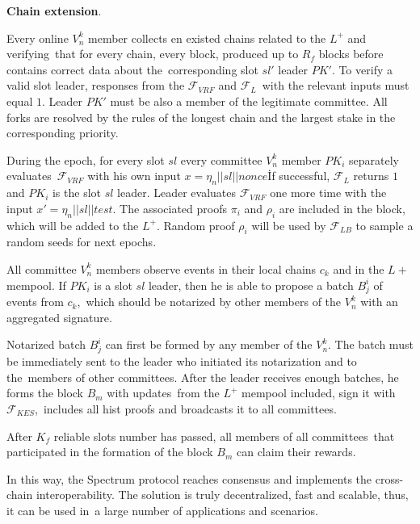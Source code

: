 \begin{legal}
    \item \textbf{Chain extension}.
    \begin{legal}

        \item Every online $V^k_n$ member collects en existed chains related to the $L^+$ and verifying\
        that for every chain, every block, produced up to $R_f$ blocks before contains correct data about the\
        corresponding slot $sl'$ leader $PK'$.
        To verify a valid slot leader, responses from the ${\mathcal{F}}_{VRF}$ and ${\mathcal{F}}_{L}$\
        with the relevant inputs must equal $1$.
        Leader $PK'$ must be also a member of the legitimate committee.
        All forks are resolved by the rules of the longest chain and the largest stake in the corresponding priority.

        \item During the epoch, for every slot $sl$ every committee $V^k_n$ member $PK_i$ separately evaluates\
        ${\mathcal{F}}_{VRF}$ with his own input ${x = \eta_n || sl || \textit{nonce}}$\.
        If successful, ${\mathcal{F}}_{L}$ returns $1$ and $PK_i$ is the slot $sl$ leader.
        Leader evaluates ${\mathcal{F}}_{VRF}$ one more time with the input ${x' = \eta_n || sl || \textit{test}}$.
        The associated proofs $\pi_i$ and $\rho_i$ are included in the block, which will be added to the $L^+$.
        Random proof $\rho_i$ will be used by ${\mathcal{F}}_{LB}$ to sample a random seeds for next epochs.

        \item All committee $V^k_n$ members observe events in their local chains $c_k$ and in the $L+$ mempool.
        If $PK_i$ is a slot $sl$ leader, then he is able to propose a batch $B^i_j$ of events from $c_k$,\
        which should be notarized by other members of the $V^k_n$ with an aggregated signature.

        \item Notarized batch $B^i_j$ can first be formed by any member of the $V^k_n$.
        The batch must be immediately sent to the leader who initiated its notarization and to the\
        members of other committees.
        After the leader receives enough batches, he forms the block $B_m$ with updates\
        from the $L^+$ mempool included, sign it with ${\mathcal{F}}_{KES}$,\
        includes all hist proofs and broadcasts it to all committees.

        \item After $K_f$ reliable slots number has passed, all members of all committees\
        that participated in the formation of the block $B_m$ can claim their rewards.
    \end{legal}
\end{legal}

In this way, the Spectrum protocol reaches consensus and implements the cross-chain interoperability.
The solution is truly decentralized, fast and scalable, thus, it can be used in\
a large number of applications and scenarios.